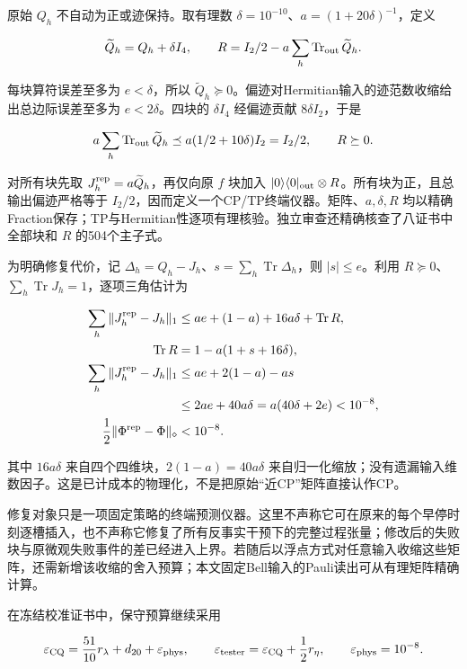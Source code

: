\documentclass[
  11pt,
  oneside]{book}
\begin{document}
原始 \(Q_h\) 不自动为正或迹保持。取有理数
\(\delta=10^{-10}\)、\(a=(1+20\delta)^{-1}\)，定义

\[
\widetilde Q_h=Q_h+\delta I_4,
\qquad
R=I_2/2-a\sum_h\operatorname{Tr}_{\rm out}\widetilde Q_h.
\]

每块算符误差至多为 \(e<\delta\)，所以
\(\widetilde Q_h\succeq0\)。偏迹对Hermitian输入的迹范数收缩给出总边际误差至多为
\(e<2\delta\)。四块的 \(\delta I_4\) 经偏迹贡献 \(8\delta I_2\)，于是

\[
a\sum_h\operatorname{Tr}_{\rm out}\widetilde Q_h
\preceq a(1/2+10\delta)I_2=I_2/2,
\qquad R\succeq0.
\]

对所有块先取 \(J_h^{\rm rep}=a\widetilde Q_h\)，再仅向原 \(f\) 块加入
\(|0\rangle\langle0|_{\rm out}\otimes R\)。所有块为正，且总输出偏迹严格等于
\(I_2/2\)，因而定义一个CP/TP终端仪器。矩阵、\(a,\delta,R\)
均以精确Fraction保存；TP与Hermitian性逐项有理核验。独立审查还精确核查了八证书中全部块和
\(R\) 的504个主子式。

为明确修复代价，记
\(\Delta_h=Q_h-J_h\)、\(s=\sum_h\operatorname{Tr}\Delta_h\)，则
\(|s|\le e\)。利用
\(R\succeq0\)、\(\sum_h\operatorname{Tr}J_h=1\)，逐项三角估计为

\[
\begin{aligned}
\sum_h\|J_h^{\rm rep}-J_h\|_1
&\le ae+(1-a)+16a\delta+\operatorname{Tr}R,\\
\operatorname{Tr}R&=1-a(1+s+16\delta),\\
\sum_h\|J_h^{\rm rep}-J_h\|_1
&\le ae+2(1-a)-as\\
&\le2ae+40a\delta
=a(40\delta+2e)<10^{-8},\\
\frac12\|\Phi^{\rm rep}-\Phi\|_\diamond&<10^{-8}.
\end{aligned}
\]

其中 \(16a\delta\) 来自四个四维块，\(2(1-a)=40a\delta\)
来自归一化缩放；没有遗漏输入维数因子。这是已计成本的物理化，不是把原始``近CP''矩阵直接认作CP。

修复对象只是一项固定策略的终端预测仪器。这里不声称它可在原来的每个早停时刻逐槽插入，也不声称它修复了所有反事实干预下的完整过程张量；修改后的失败块与原微观失败事件的差已经进入上界。若随后以浮点方式对任意输入收缩这些矩阵，还需新增该收缩的舍入预算；本文固定Bell输入的Pauli读出可从有理矩阵精确计算。

在冻结校准证书中，保守预算继续采用

\[
\varepsilon_{\rm CQ}
=\frac{51}{10}r_\lambda+d_{20}+\varepsilon_{\rm phys},
\qquad
\varepsilon_{\rm tester}
=\varepsilon_{\rm CQ}+\frac12r_\eta,
\qquad \varepsilon_{\rm phys}=10^{-8}.
\]
\end{document}
